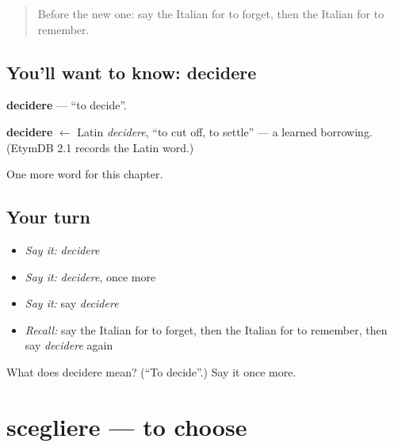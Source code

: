 \label{lesson:IT-C175-decidere}



\begin{quote}
Before the new one: say the Italian for to forget, then the Italian for to remember.
\end{quote}

\subsection*{You'll want to know: decidere}
\textbf{decidere} — \textquotedblleft{}to decide\textquotedblright{}.

\begin{cousinweb}
\textbf{decidere} $\leftarrow$ Latin \emph{decidere}, \textquotedblleft{}to cut off, to settle\textquotedblright{} — a learned borrowing. (EtymDB 2.1 records the Latin word.)
\end{cousinweb}

\begin{grammarlens}[title={What you've built}]
One more word for this chapter.
\end{grammarlens}

\subsection*{Your turn}
\begin{itemize}
\raggedright
  \item \emph{Say it:} \emph{decidere}
  \item \emph{Say it:} \emph{decidere}, once more
  \item \emph{Say it:} say \emph{decidere}
  \item \emph{Recall:} say the Italian for to forget, then the Italian for to remember, then say \emph{decidere} again
\end{itemize}

\begin{tcolorbox}[breakable,colback=teal!4,colframe=teal!35!black,title={Before you move on}]
What does decidere mean? (\textquotedblleft{}To decide\textquotedblright{}.) Say it once more.
\end{tcolorbox}
\section[scegliere]{scegliere — to choose}

\label{lesson:IT-C175-scegliere}



